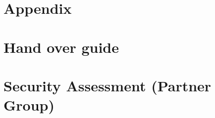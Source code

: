 \pagebreak
\printbibliography


\pagebreak
\section{Appendix}
\appendix


\section{Hand over guide}

\section{Security Assessment (Partner Group)}